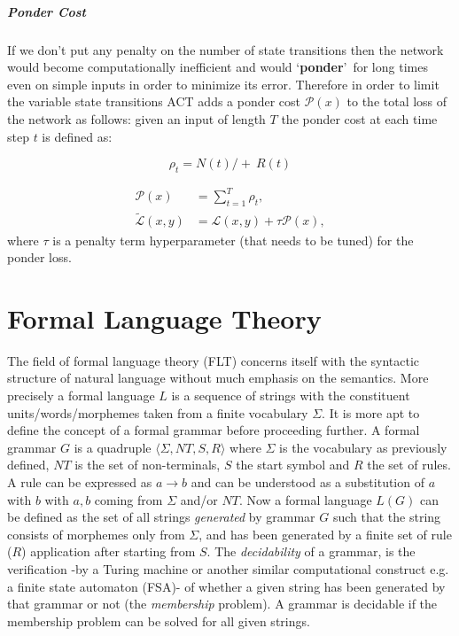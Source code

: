 \subparagraph{Ponder Cost} If we don't put any penalty on the number of state transitions then the network would become computationally inefficient and would \lq \textbf{ponder}{}\rq\ for long times even on simple inputs in order to minimize its error. Therefore in order to limit the variable state transitions ACT adds a ponder cost $\mathcal{P}(x)$ to the total loss of the network as follows:
given an input of length $T$ the ponder cost at each time step $t$ is defined as:

\begin{equation}
\rho_t = N(t)/ +\ R(t)
\end{equation}

\begin{equation}
\begin{aligned}
\mathcal{P}(x) &= \sum_{t=1}^T \rho_t, \\
\widetilde{\mathcal{L}}(x,y) &= \mathcal{L}(x,y) + \tau\mathcal{P}(x),
\end{aligned}	
\end{equation}
where $\tau$ is a penalty term hyperparameter (that needs to be tuned) for the ponder loss.

\section{Formal Language Theory}\label{flt}
The field of formal language theory (FLT) concerns itself with the syntactic structure of natural language without much emphasis on the semantics. More precisely a formal language $L$ is a sequence of strings with the constituent units/words/morphemes taken from a finite vocabulary $\Sigma$. It is more apt to define the concept of a formal grammar before proceeding further. A formal grammar $G$ is a quadruple $\langle \Sigma, NT, S, R \rangle$ where $\Sigma$ is the vocabulary as previously defined, $NT$ is the set of non-terminals, $S$ the start symbol and $R$ the set of rules. A rule can be expressed as $a \rightarrow b$ and can be understood as a substitution of $a$ with $b$ with $a, b$ coming from $\Sigma$ and/or $NT$. Now a formal language $L(G)$ can be defined as the set of all strings  \textit{generated} by grammar $G$ such that the string consists of morphemes only from $\Sigma$, and has been generated by a finite set of rule ($R$) application after starting from $S$. The \textit{decidability} of a grammar, is the verification -by a Turing machine or another similar computational construct e.g. a finite state automaton (FSA)- of whether a given string has been generated by that grammar or not (the \textit{membership} problem). A grammar is decidable if the membership problem can be solved for all given strings.


